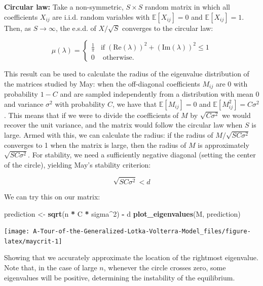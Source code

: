 \documentclass[
]{book}
\newenvironment{Shaded}{\begin{snugshade}}{\end{snugshade}}
\newcommand{\DecValTok}[1]{\textcolor[rgb]{0.00,0.00,0.81}{#1}}
\newcommand{\KeywordTok}[1]{\textcolor[rgb]{0.13,0.29,0.53}{\textbf{#1}}}
\newcommand{\NormalTok}[1]{#1}
\newcommand{\OperatorTok}[1]{\textcolor[rgb]{0.81,0.36,0.00}{\textbf{#1}}}
\newcommand{\StringTok}[1]{\textcolor[rgb]{0.31,0.60,0.02}{#1}}
\begin{document}
\textbf{Circular law:} Take a non-symmetric, \(S \times S\) random matrix in which all coefficients \(X_{ij}\) are i.i.d. random variables with \(\mathbb E[X_{ij}] = 0\) and \(\mathbb E[X_{ij}] = 1\). Then, as \(S \to \infty\), the e.s.d. of \({X} / \sqrt{S}\) converges to the circular law:

\[
  \mu(\lambda) = \begin{cases}
    \frac{1}{\pi} \; \; \; \text{if} \; (\text{Re}(\lambda))^2 +
    (\text{Im}(\lambda))^2 \leq 1\\
    0 \; \; \;\text{ otherwise}.
  \end{cases}
\]

This result can be used to calculate the radius of the eigenvalue distribution of the matrices studied by May: when the off-diagonal coefficients \(M_{ij}\) are 0 with probability \(1-C\) and are sampled independently from a distribution with mean \(0\) and variance \(\sigma^2\) with probability \(C\), we have that \(\mathbb E[M_{ij}] = 0\) and \(\mathbb E[M_{ij}^2] = C \sigma^2\). This means that if we were to divide the coefficients of \({M}\) by \(\sqrt{C \sigma^2}\) we would recover the unit variance, and the matrix would follow the circular law when \(S\) is large. Armed with this, we can calculate the radius: if the radius of \({M} / \sqrt{S C \sigma^2}\) converges to 1 when the matrix is large, then the radius of \({M}\) is approximately \(\sqrt{S C \sigma^2}\). For stability, we need a sufficiently negative diagonal (setting the center of the circle), yielding May's stability criterion:

\[
\sqrt{S C \sigma^2} < d
\]

We can try this on our matrix:

\begin{Shaded}
\begin{Highlighting}[]
\NormalTok{prediction <-}\StringTok{ }\KeywordTok{sqrt}\NormalTok{(n }\OperatorTok{*}\StringTok{ }\NormalTok{C }\OperatorTok{*}\StringTok{ }\NormalTok{sigma}\OperatorTok{^}\DecValTok{2}\NormalTok{) }\OperatorTok{-}\StringTok{ }\NormalTok{d}
\KeywordTok{plot_eigenvalues}\NormalTok{(M, prediction)}
\end{Highlighting}
\end{Shaded}

\begin{center}\texttt{[image: A-Tour-of-the-Generalized-Lotka-Volterra-Model\_files/figure-latex/maycrit-1]} \end{center}

Showing that we accurately approximate the location of the rightmost eigenvalue. Note that, in the case of large \(n\), whenever the circle crosses zero, some eigenvalues will be positive, determining the instability of the equilibrium.
\end{document}
